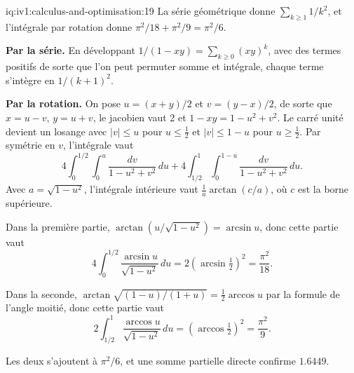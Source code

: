 \begin{solution}{iq:iv1:calculus-and-optimisation:19}
La série géométrique donne $\sum_{k \ge 1} 1/k^2$, et l'intégrale par rotation donne $\pi^2/18 + \pi^2/9 = \pi^2/6$.

\textbf{Par la série.} En développant $1/(1 - xy) = \sum_{k \ge 0}(xy)^k$, avec des termes positifs de sorte que l'on peut permuter somme et intégrale, chaque terme s'intègre en $1/(k + 1)^2$.

\textbf{Par la rotation.} On pose $u = (x + y)/2$ et $v = (y - x)/2$, de sorte que $x = u - v$, $y = u + v$, le jacobien vaut 2 et $1 - xy = 1 - u^2 + v^2$. Le carré unité devient un losange avec $|v| \le u$ pour $u \le \frac12$ et $|v| \le 1 - u$ pour $u \ge \frac12$. Par symétrie en $v$, l'intégrale vaut
\[
4\int_0^{1/2}\!\!\int_0^u \frac{dv}{1 - u^2 + v^2}\,du + 4\int_{1/2}^1\!\!\int_0^{1 - u}\frac{dv}{1 - u^2 + v^2}\,du.
\]
Avec $a = \sqrt{1 - u^2}$, l'intégrale intérieure vaut $\frac1a\arctan(c/a)$, où $c$ est la borne supérieure.

Dans la première partie, $\arctan(u/\sqrt{1 - u^2}) = \arcsin u$, donc cette partie vaut
\[
4\int_0^{1/2}\frac{\arcsin u}{\sqrt{1 - u^2}}\,du = 2\left(\arcsin\tfrac12\right)^2 = \frac{\pi^2}{18}.
\]

Dans la seconde, $\arctan\sqrt{(1 - u)/(1 + u)} = \frac12\arccos u$ par la formule de l'angle moitié, donc cette partie vaut
\[
2\int_{1/2}^1\frac{\arccos u}{\sqrt{1 - u^2}}\,du = \left(\arccos\tfrac12\right)^2 = \frac{\pi^2}{9}.
\]

Les deux s'ajoutent à $\pi^2/6$, et une somme partielle directe confirme $1.6449$.



\end{solution}

